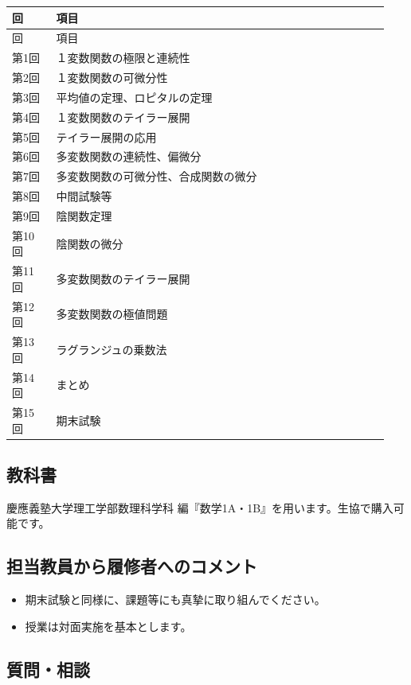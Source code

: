 \documentclass[a4paper,12pt]{jsarticle}
\begin{document}
\begin{longtable}{@{}p{0.11\linewidth}p{0.83\linewidth}@{}}
\toprule
回 & 項目 \\
\midrule
\endhead
\toprule
回 & 項目 \\
\midrule
\endhead
\bottomrule
\endfoot
第1回 & １変数関数の極限と連続性 \\
第2回 & １変数関数の可微分性 \\
第3回 & 平均値の定理、ロピタルの定理 \\
第4回 & １変数関数のテイラー展開 \\
第5回 & テイラー展開の応用 \\
第6回 & 多変数関数の連続性、偏微分 \\
第7回 & 多変数関数の可微分性、合成関数の微分 \\
第8回 & 中間試験等 \\
第9回 & 陰関数定理 \\
第10回 & 陰関数の微分 \\
第11回 & 多変数関数のテイラー展開 \\
第12回 & 多変数関数の極値問題 \\
第13回 & ラグランジュの乗数法 \\
第14回 & まとめ \\
第15回 & 期末試験 \\
\end{longtable}


\subsection*{教科書}

慶應義塾大学理工学部数理科学科 編『数学1A・1B』を用います。生協で購入可能です。

\subsection*{担当教員から履修者へのコメント}

\begin{itemize}[leftmargin=2em]
\item 期末試験と同様に、課題等にも真摯に取り組んでください。
\item 授業は対面実施を基本とします。
\end{itemize}

\subsection*{質問・相談}
\end{document}
